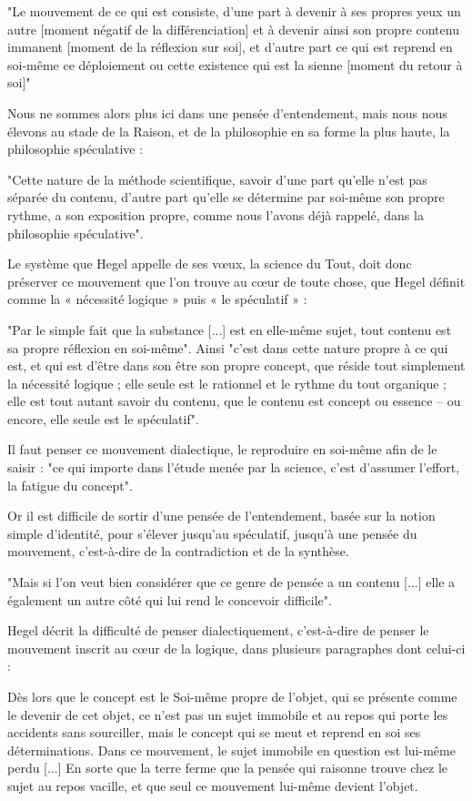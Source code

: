 "Le mouvement de ce qui est consiste, d’une part à devenir à ses propres yeux un autre [moment négatif de la différenciation] et à devenir ainsi son propre contenu immanent [moment de la réflexion sur soi], et d’autre part ce qui est reprend en soi-même ce déploiement ou cette existence qui est la sienne [moment du retour à soi]"

Nous ne sommes alors plus ici dans une pensée d’entendement, mais nous nous élevons au stade de la Raison, et de la philosophie en sa forme la plus haute, la philosophie spéculative :

"Cette nature de la méthode scientifique, savoir d’une part qu’elle n’est pas séparée du contenu, d’autre part qu’elle se détermine par soi-même son propre rythme, a son exposition propre, comme nous l’avons déjà rappelé, dans la philosophie spéculative".

Le système que Hegel appelle de ses vœux, la science du Tout, doit donc préserver ce mouvement que l’on trouve au cœur de toute chose, que Hegel définit comme la « nécessité logique » puis « le spéculatif » :

"Par le simple fait que la substance [...] est en elle-même sujet, tout contenu est sa propre réflexion en soi-même". Ainsi "c’est dans cette nature propre à ce qui est, et qui est d’être dans son être son propre concept, que réside tout simplement la nécessité logique ; elle seule est le rationnel et le rythme du tout organique ; elle est tout autant savoir du contenu, que le contenu est concept ou essence – ou encore, elle seule est le spéculatif".

Il faut penser ce mouvement dialectique, le reproduire en soi-même afin de le saisir : "ce qui importe dans l’étude menée par la science, c’est d’assumer l’effort, la fatigue du concept".

Or il est difficile de sortir d’une pensée de l’entendement, basée sur la notion simple d’identité, pour s’élever jusqu’au spéculatif, jusqu’à une pensée du mouvement, c’est-à-dire de la contradiction et de la synthèse.

"Mais si l’on veut bien considérer que ce genre de pensée a un contenu [...] elle a également un autre côté qui lui rend le concevoir difficile".

Hegel décrit la difficulté de penser dialectiquement, c’est-à-dire de penser le mouvement inscrit au cœur de la logique, dans plusieurs paragraphes dont celui-ci :

    Dès lors que le concept est le Soi-même propre de l’objet, qui se présente comme le devenir de cet objet, ce n’est pas un sujet immobile et au repos qui porte les accidents sans sourciller, mais le concept qui se meut et reprend en soi ses déterminations. Dans ce mouvement, le sujet immobile en question est lui-même perdu [...] En sorte que la terre ferme que la pensée qui raisonne trouve chez le sujet au repos vacille, et que seul ce mouvement lui-même devient l’objet.


